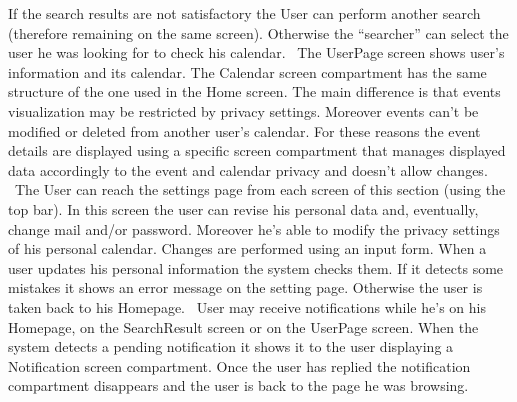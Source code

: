 \documentclass[10pt,a4paper,titlepage]{article}
\begin{document}
If the search results are not satisfactory the User can perform another search (therefore remaining on the same screen). Otherwise the “searcher” can select the user he was looking for to check his calendar.
\
The UserPage screen shows user’s information and its calendar. The Calendar screen compartment has the same structure of the one used in the Home screen. The main difference is that events visualization may be restricted by privacy settings. Moreover events can’t be modified or deleted from another user’s calendar. For these reasons the event details are displayed using a specific screen compartment that manages displayed data accordingly to the event and calendar privacy and doesn’t allow changes.
\
The User can reach the settings page from each screen of this section (using the top bar). In this screen the user can revise his personal data and, eventually, change mail and/or password. Moreover he’s able to modify the privacy settings of his personal calendar. Changes are performed using an input form. 
When a user updates his personal information the system checks them. If it detects some mistakes  it shows an error message on the setting page. Otherwise the user is taken back to his Homepage.
\
User may receive notifications while he’s on his Homepage, on the SearchResult screen or on the UserPage screen. When the system detects a pending notification it shows it to the user displaying a Notification screen compartment. Once the user has replied the notification compartment disappears and the user is back to the page he was browsing.
\end{document}
